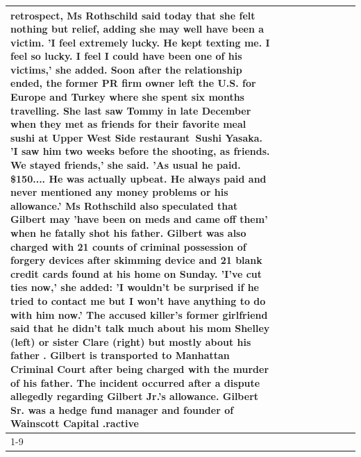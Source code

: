 \begin{table}[H]
\begin{tabular}{lllrlllll}
retrospect, Ms Rothschild said today that she felt nothing but relief, adding she may well have been a victim. 'I feel extremely lucky. He kept texting me. I feel so lucky. I feel I could have been one of his victims,' she added. Soon after the relationship ended, the former PR firm owner left the U.S. for Europe and Turkey where she spent six months  travelling. She last saw Tommy in late December when they met as friends for their favorite meal sushi at Upper West Side restaurant Sushi Yasaka. 'I saw him two weeks before the shooting, as friends. We stayed friends,' she said. 'As usual he paid. \$150.... He was actually upbeat. He always paid and never mentioned any money problems or his allowance.' Ms Rothschild also speculated that Gilbert may 'have been on meds and came off them' when he fatally shot his father. Gilbert was also charged with 21 counts of criminal possession of forgery devices after skimming device and 21 blank credit cards found at his home on Sunday. 'I've cut ties now,' she added: 'I wouldn’t be surprised if he tried to contact me but I won’t have anything to do with him now.' The accused killer's former girlfriend said that he didn't talk much about his mom Shelley (left) or sister Clare (right) but mostly about his father . Gilbert is transported to Manhattan Criminal Court  after being charged with the murder of his father. The incident occurred after a dispute allegedly regarding Gilbert Jr.'s allowance. Gilbert Sr. was a hedge fund manager and founder of Wainscott Capital .ractive \\
\cline{1-9} \cline{2-9}

\end{tabular}
\end{table}
